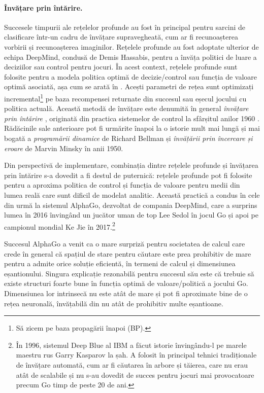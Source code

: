\documentclass[../../book-main_ro.tex]{subfiles}
\begin{document}
\paragraph{Învățare prin întărire.}
Succesele timpurii ale rețelelor profunde au fost în principal pentru sarcini de clasificare într-un cadru de învățare supravegheată, cum ar fi recunoașterea vorbirii și recunoașterea imaginilor. Rețelele profunde au fost adoptate ulterior de echipa DeepMind, condusă de Demis Hassabis, pentru a învăța politici de luare a deciziilor sau control pentru jocuri. În acest context, rețelele profunde sunt folosite pentru a modela politica optimă de decizie/control sau funcția de valoare optimă asociată, așa cum se arată în . Acești parametri de rețea sunt optimizați incremental\footnote{Să zicem pe baza propagării înapoi (BP).} pe baza recompensei returnate din succesul sau eșecul jocului cu politica actuală. Această metodă de învățare este denumită în general {\em învățare prin întărire} \cite{Sutton-Barto}, originată din practica sistemelor de control la sfârșitul anilor 1960 \cite{Waltz1965AHA,Mendel1970ReinforcementlearningCA}. Rădăcinile sale anterioare pot fi urmărite înapoi la o istorie mult mai lungă și mai bogată a {\em programării dinamice} de Richard Bellman \cite{Bellman-DP} și {\em învățării prin încercare și eroare} de Marvin Minsky \cite{Minsky-1954} în anii 1950.

Din perspectivă de implementare, combinația dintre rețelele profunde și învățarea prin întărire s-a dovedit a fi destul de puternică: rețelele profunde pot fi folosite pentru a aproxima politica de control și funcția de valoare pentru medii din lumea reală care sunt dificil de modelat analitic. Această practică a condus în cele din urmă la sistemul AlphaGo, dezvoltat de compania DeepMind, care a surprins lumea în 2016 învingând un jucător uman de top Lee Sedol în jocul Go și apoi pe campionul mondial Ke Jie în 2017.\footnote{În 1996, sistemul Deep Blue al IBM a făcut istorie învingându-l pe marele maestru rus Garry Kasparov la șah. A folosit în principal tehnici tradiționale de învățare automată, cum ar fi căutarea în arbore și tăierea, care nu erau atât de scalabile și nu s-au dovedit de succes pentru jocuri mai provocatoare precum Go timp de peste 20 de ani.}

Succesul AlphaGo a venit ca o mare surpriză pentru societatea de calcul care crede în general că spațiul de stare pentru căutare este prea prohibitiv de mare pentru a admite orice soluție eficientă, în termeni de calcul și dimensiunea eșantionului. Singura explicație rezonabilă pentru succesul său este că trebuie să existe structuri foarte bune în funcția optimă de valoare/politică a jocului Go. Dimensiunea lor intrinsecă nu este atât de mare și pot fi aproximate bine de o rețea neuronală, învățabilă din nu atât de prohibitiv multe eșantioane.
\end{document}

